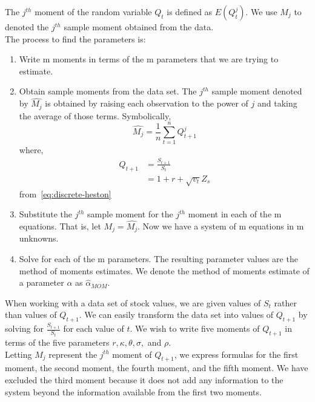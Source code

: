 The $j^{th}$ moment of the random variable $Q_t$ is defined as $E(Q_t^j)$.
We use $M_j$ to denoted the $j^{th}$ sample moment obtained from the data. \\

The process to find the parameters is:
\begin{enumerate}
	\item Write m moments in terms of the m parameters that we are trying
	to estimate.

	\item Obtain sample moments from the data set.
	The $j^{th}$ sample moment denoted by $\hat{M_j}$ is obtained by
	raising each observation to the power of $j$ and taking the average
	of those terms.
	Symbolically,
	\begin{equation}
		\hat{M_j} = \frac{1}{n}\sum_{t=1}^{n}Q_{t+1}^j
	\end{equation}
	where,
	\begin{align}
		Q_{t+1} &= \frac{S_{t+1}}{S_{t}}\\
		&= 1 + r + \sqrt{v_t}Z_s
	\end{align}
	from~\ref{eq:discrete-heston}

	\item Substitute the $j^{th}$ sample moment for the $j^{th}$ moment
	in each of the m equations.
	That is, let $M_j = \hat{M_j}$.
	Now we have a system of m equations in m unknowns.

	\item Solve for each of the m parameters.
	The resulting parameter values are the method of moments estimates.
	We denote the method of moments estimate of a parameter $\alpha$ as
	$\hat{\alpha}_{MOM}$.

\end{enumerate}

When working with a data set of stock values, we are given values of $S_t$
rather than values of $Q_{t+1}$.
We can easily transform the data set into values of $Q_{t+1}$ by solving
for $\frac{S_{t+1}}{S_t}$ for each value of $t$.
We wish to write five moments of $Q_{t+1}$ in terms of the five
parameters $r, \kappa, \theta, \sigma,$ and $\rho$. \\

Letting $M_j$ represent the $j^{th}$ moment of $Q_{t+1}$,
we express formulas for the first moment, the second moment,
the fourth moment, and the fifth moment.
We have excluded the third moment because it does not add any
information to the system beyond the information available
from the first two moments. \\

